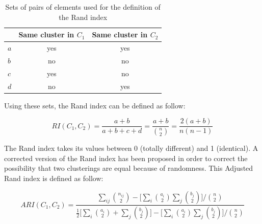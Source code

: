\documentclass[a4paper]{report}
\begin{document}
    \vspace{0.8cm}

    \begin{table}[h]
    \centering
    \begin{tabular}{lcc}
                                       & \multicolumn{1}{l}{\textbf{Same cluster in $C_1$}} & \multicolumn{1}{l}{\textbf{Same cluster in $C_2$}} \\ \bottomrule
    \multicolumn{1}{l}{\textbf{$a$}} & yes                                                 & yes                                                 \\ \bottomrule
    \multicolumn{1}{l}{\textbf{$b$}} & no                                                  & no                                                  \\ \bottomrule
    \multicolumn{1}{l}{\textbf{$c$}} & yes                                                 & no                                                  \\ \bottomrule
    \multicolumn{1}{l}{\textbf{$d$}} & no                                                  & yes                                                 \\ \bottomrule
    \end{tabular}
    \caption{Sets of pairs of elements used for the definition of the Rand index}
\label{tab:rand_index}
    \end{table}

    \vspace{0.8cm}

    Using these sets, the Rand index can be defined as follow:

    \begin{equation}
        RI(C_1, C_2) = \frac{a + b}{a + b + c + d} = \frac{a + b}{\binom{n}{2}} = \frac{2(a + b)}{n(n-1)}
        \label{eq:rand_index}
    \end{equation}

    The Rand index takes its values between 0 (totally different) and 1 (identical). A corrected version of the Rand index has been proposed in order to correct the possibility that two clusterings are equal because of randomness. This Adjusted Rand index is defined as follow:

    \begin{equation}
        ARI(C_1, C_2) = \frac{\sum_{ij}\binom{n_{ij}}{2} - \big[\sum_i\binom{a_i}{2}\sum_j\binom{b_j}{2}\big]/\binom{n}{2}}{\frac{1}{2}\big[\sum_i\binom{a_i}{2} + \sum_j\binom{b_j}{2}\big] - \big[\sum_i\binom{a_i}{2}\sum_j\binom{b_j}{2}\big]/\binom{n}{2}}
        \label{eq:adj_rand_index}
    \end{equation}
\end{document}
